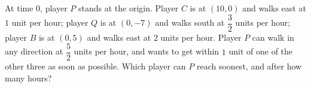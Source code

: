At time $0$, player $P$ stands at the origin. Player $C$ is at $(10,0)$ and walks east at $1$ unit per hour; player $Q$ is at $(0,-7)$ and walks south at $\dfrac32$ units per hour; player $B$ is at $(0,5)$ and walks east at $2$ units per hour. Player $P$ can walk in any direction at $\dfrac52$ units per hour, and wants to get within $1$ unit of one of the other three as soon as possible. Which player can $P$ reach soonest, and after how many hours?
